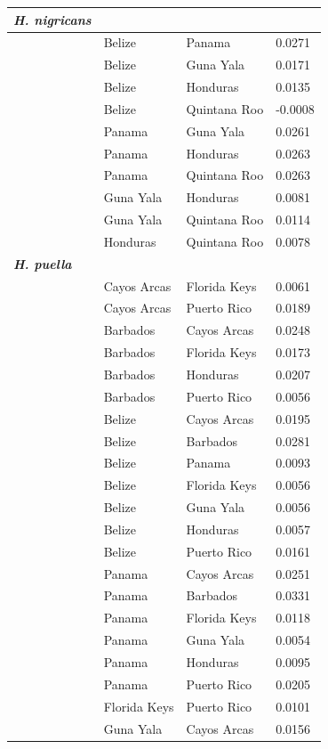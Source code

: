 \begin{xltabular}{\textwidth}{p{5cm}XXX}
    \hline
    \textbf{\emph{H. nigricans}} & &  &\\
    \hline
    \hline
    & Belize & Panama & 0.0271\\
    & Belize & Guna Yala & 0.0171\\
    & Belize & Honduras & 0.0135\\
    & Belize & Quintana Roo & -0.0008\\
    & Panama & Guna Yala & 0.0261\\
    & Panama & Honduras & 0.0263\\
    & Panama & Quintana Roo & 0.0263\\
    & Guna Yala & Honduras & 0.0081\\
    & Guna Yala & Quintana Roo & 0.0114\\
    & Honduras & Quintana Roo & 0.0078\\
    \addlinespace
    \hline
    \hline
    \textbf{\emph{H. puella}} &  &  &  \\
    \hline
    \hline
    & Cayos Arcas & Florida Keys & 0.0061\\
    & Cayos Arcas & Puerto Rico & 0.0189\\
    & Barbados & Cayos Arcas & 0.0248\\
    & Barbados & Florida Keys & 0.0173\\
    & Barbados & Honduras & 0.0207\\
    & Barbados & Puerto Rico & 0.0056\\
    & Belize & Cayos Arcas & 0.0195\\
    & Belize & Barbados & 0.0281\\
    & Belize & Panama & 0.0093\\
    & Belize & Florida Keys & 0.0056\\
    & Belize & Guna Yala & 0.0056\\
    & Belize & Honduras & 0.0057\\
    & Belize & Puerto Rico & 0.0161\\
    & Panama & Cayos Arcas & 0.0251\\
    & Panama & Barbados & 0.0331\\
    & Panama & Florida Keys & 0.0118\\
    & Panama & Guna Yala & 0.0054\\
    & Panama & Honduras & 0.0095\\
    & Panama & Puerto Rico & 0.0205\\
    & Florida Keys & Puerto Rico & 0.0101\\
    & Guna Yala & Cayos Arcas & 0.0156\\

\end{xltabular}
